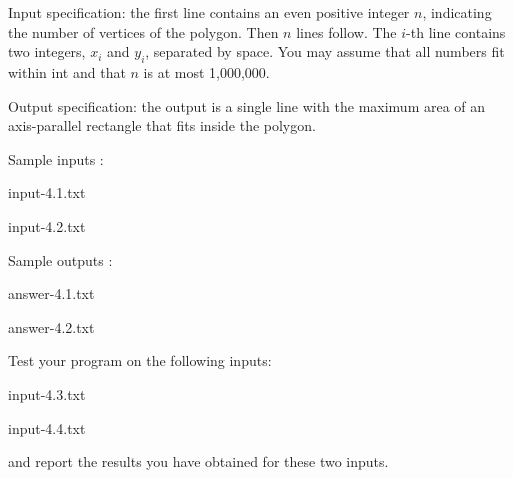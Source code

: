 \documentclass[11pt]{article}
\begin{document}
Input specification: the first line contains an even positive integer $n$, indicating the number of vertices of the polygon. Then $n$ lines follow. The $i$-th line contains two integers, $x_i$ and $y_i$, separated by space. You may assume that all numbers fit within int and that $n$  is at most 1,000,000. 

Output specification: the output is a single line with the maximum area of an axis-parallel rectangle that fits inside the polygon. 



Sample inputs :
 
input-4.1.txt

input-4.2.txt


Sample outputs :
 
  answer-4.1.txt  

 answer-4.2.txt  

\medskip

Test your program on the following inputs:

input-4.3.txt 

input-4.4.txt 

and report the results you have obtained for these two inputs.

\fi
\end{document}
